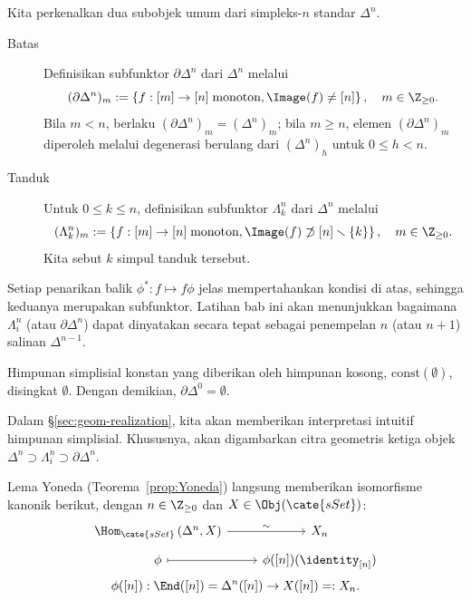\begin{example}\label{eg:boundary-horn}
	Kita perkenalkan dua subobjek umum dari simpleks-$n$ standar $\Delta^n$.
	\begin{description}
		\item[Batas] Definisikan subfunktor $\partial\Delta^n$ dari $\Delta^n$
		melalui
		\[ (\partial \Delta^n)_m := \left\{ f: [m] \to [n] \; \text{monoton}, \Image(f) \neq [n] \right\}, \quad m \in \Z_{\geq 0}. \]
		Bila $m<n$, berlaku
		$(\partial\Delta^n)_m=(\Delta^n)_m$; bila $m\geq n$, elemen
		$(\partial\Delta^n)_m$ diperoleh melalui degenerasi berulang dari
		$(\Delta^n)_h$ untuk $0\leq h<n$.
		\item[Tanduk] Untuk $0\leq k\leq n$, definisikan subfunktor
		$\Lambda^n_k$ dari $\Delta^n$ melalui
		\[ (\Lambda^n_k)_m := \left\{ f: [m] \to [n] \;\text{monoton}, \Image(f) \not\supset [n] \smallsetminus \{k\} \right\}, \quad m \in \Z_{\geq 0}. \]
		Kita sebut $k$ simpul tanduk tersebut.
	\end{description}

	Setiap penarikan balik $\phi^*:f\mapsto f\phi$ jelas mempertahankan
	kondisi di atas, sehingga keduanya merupakan subfunktor. Latihan bab ini
	akan menunjukkan bagaimana $\Lambda^n_i$ (atau $\partial\Delta^n$) dapat
	dinyatakan secara tepat sebagai penempelan $n$ (atau $n+1$) salinan
	$\Delta^{n-1}$.
\end{example}

Himpunan simplisial konstan yang diberikan oleh himpunan kosong,
$\mathrm{const}(\emptyset)$, disingkat $\emptyset$. Dengan demikian,
$\partial\Delta^0=\emptyset$.

Dalam \S\ref{sec:geom-realization}, kita akan memberikan interpretasi intuitif
himpunan simplisial. Khususnya, akan digambarkan citra geometris ketiga objek
$\Delta^n\supset\Lambda^n_i\supset\partial\Delta^n$.

Lema Yoneda (Teorema~\ref{prop:Yoneda}) langsung memberikan isomorfisme
kanonik berikut, dengan $n\in\Z_{\geq0}$ dan
$X\in\Obj(\cate{sSet})$:
\begin{equation}\begin{gathered}
	\begin{tikzcd}[row sep=tiny]
		\Hom_{\cate{sSet}}\left( \Delta^n, X \right) \arrow[r, "\sim"] & X_n \\
		\phi \arrow[mapsto, r] & \phi([n])(\identity_{[n]})
	\end{tikzcd} \\
	\phi([n]): \End([n]) = \Delta^n([n]) \to X([n]) =: X_n.
\end{gathered}\end{equation}

